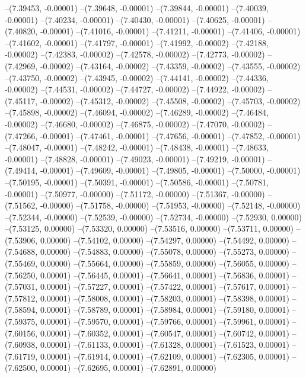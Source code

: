 --(7.39453, -0.00001)
--(7.39648, -0.00001)
--(7.39844, -0.00001)
--(7.40039, -0.00001)
--(7.40234, -0.00001)
--(7.40430, -0.00001)
--(7.40625, -0.00001)
--(7.40820, -0.00001)
--(7.41016, -0.00001)
--(7.41211, -0.00001)
--(7.41406, -0.00001)
--(7.41602, -0.00001)
--(7.41797, -0.00001)
--(7.41992, -0.00002)
--(7.42188, -0.00002)
--(7.42383, -0.00002)
--(7.42578, -0.00002)
--(7.42773, -0.00002)
--(7.42969, -0.00002)
--(7.43164, -0.00002)
--(7.43359, -0.00002)
--(7.43555, -0.00002)
--(7.43750, -0.00002)
--(7.43945, -0.00002)
--(7.44141, -0.00002)
--(7.44336, -0.00002)
--(7.44531, -0.00002)
--(7.44727, -0.00002)
--(7.44922, -0.00002)
--(7.45117, -0.00002)
--(7.45312, -0.00002)
--(7.45508, -0.00002)
--(7.45703, -0.00002)
--(7.45898, -0.00002)
--(7.46094, -0.00002)
--(7.46289, -0.00002)
--(7.46484, -0.00002)
--(7.46680, -0.00002)
--(7.46875, -0.00002)
--(7.47070, -0.00002)
--(7.47266, -0.00001)
--(7.47461, -0.00001)
--(7.47656, -0.00001)
--(7.47852, -0.00001)
--(7.48047, -0.00001)
--(7.48242, -0.00001)
--(7.48438, -0.00001)
--(7.48633, -0.00001)
--(7.48828, -0.00001)
--(7.49023, -0.00001)
--(7.49219, -0.00001)
--(7.49414, -0.00001)
--(7.49609, -0.00001)
--(7.49805, -0.00001)
--(7.50000, -0.00001)
--(7.50195, -0.00001)
--(7.50391, -0.00001)
--(7.50586, -0.00001)
--(7.50781, -0.00001)
--(7.50977, -0.00000)
--(7.51172, -0.00000)
--(7.51367, -0.00000)
--(7.51562, -0.00000)
--(7.51758, -0.00000)
--(7.51953, -0.00000)
--(7.52148, -0.00000)
--(7.52344, -0.00000)
--(7.52539, -0.00000)
--(7.52734, -0.00000)
--(7.52930, 0.00000)
--(7.53125, 0.00000)
--(7.53320, 0.00000)
--(7.53516, 0.00000)
--(7.53711, 0.00000)
--(7.53906, 0.00000)
--(7.54102, 0.00000)
--(7.54297, 0.00000)
--(7.54492, 0.00000)
--(7.54688, 0.00000)
--(7.54883, 0.00000)
--(7.55078, 0.00000)
--(7.55273, 0.00000)
--(7.55469, 0.00000)
--(7.55664, 0.00000)
--(7.55859, 0.00000)
--(7.56055, 0.00000)
--(7.56250, 0.00001)
--(7.56445, 0.00001)
--(7.56641, 0.00001)
--(7.56836, 0.00001)
--(7.57031, 0.00001)
--(7.57227, 0.00001)
--(7.57422, 0.00001)
--(7.57617, 0.00001)
--(7.57812, 0.00001)
--(7.58008, 0.00001)
--(7.58203, 0.00001)
--(7.58398, 0.00001)
--(7.58594, 0.00001)
--(7.58789, 0.00001)
--(7.58984, 0.00001)
--(7.59180, 0.00001)
--(7.59375, 0.00001)
--(7.59570, 0.00001)
--(7.59766, 0.00001)
--(7.59961, 0.00001)
--(7.60156, 0.00001)
--(7.60352, 0.00001)
--(7.60547, 0.00001)
--(7.60742, 0.00001)
--(7.60938, 0.00001)
--(7.61133, 0.00001)
--(7.61328, 0.00001)
--(7.61523, 0.00001)
--(7.61719, 0.00001)
--(7.61914, 0.00001)
--(7.62109, 0.00001)
--(7.62305, 0.00001)
--(7.62500, 0.00001)
--(7.62695, 0.00001)
--(7.62891, 0.00000)

